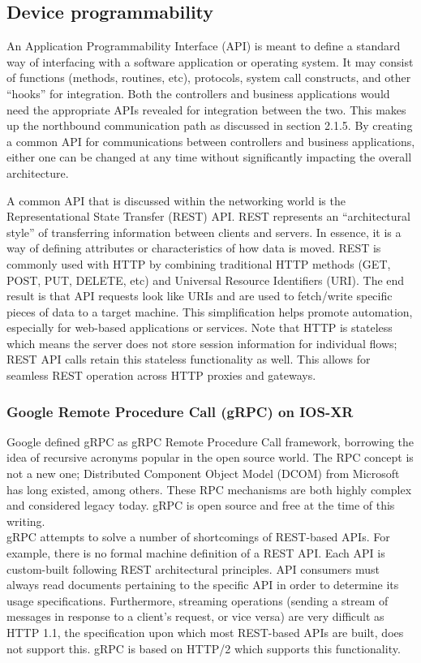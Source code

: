 \subsection{Device programmability}
An Application Programmability Interface (API) is meant to define a standard
way of interfacing with a software application or operating system. It may
consist of functions (methods, routines, etc), protocols, system call
constructs, and other ``hooks'' for integration. Both the controllers and
business applications would need the appropriate APIs revealed for integration
between the two. This makes up the northbound communication path as discussed
in section 2.1.5. By creating a common API for communications between
controllers and business applications, either one can be changed at any time
without significantly impacting the overall architecture.

A common API that is discussed within the networking world is the
Representational State Transfer (REST) API. REST represents an ``architectural
style'' of transferring information between clients and servers. In essence, it
is a way of defining attributes or characteristics of how data is moved. REST
is commonly used with HTTP by combining traditional HTTP methods (GET, POST,
PUT, DELETE, etc) and Universal Resource Identifiers (URI). The end result is
that API requests look like URIs and are used to fetch/write specific pieces
of data to a target machine. This simplification helps promote automation,
especially for web-based applications or services. Note that HTTP is stateless
which means the server does not store session information for individual
flows; REST API calls retain this stateless functionality as well. This allows
for seamless REST operation across HTTP proxies and gateways.

\subsubsection{Google Remote Procedure Call (gRPC) on IOS-XR}
Google defined gRPC as gRPC Remote Procedure Call framework, borrowing the
idea of recursive acronyms popular in the open source world. The RPC concept
is not a new one; Distributed Component Object Model (DCOM) from Microsoft has
long existed, among others. These RPC mechanisms are both highly complex and
considered legacy today. gRPC is open source and free at the time of this
writing. \\

gRPC attempts to solve a number of shortcomings of REST-based APIs. For
example, there is no formal machine definition of a REST API. Each API is
custom-built following REST architectural principles. API consumers must
always read documents pertaining to the specific API in order to determine its
usage specifications. Furthermore, streaming operations (sending a stream of
messages in response to a client's request, or vice versa) are very difficult
as HTTP 1.1, the specification upon which most REST-based APIs are built, does
not support this. gRPC is based on HTTP/2 which supports this functionality. \\

